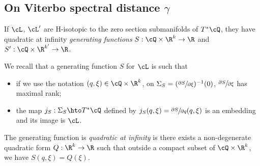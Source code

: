 \subsection{On Viterbo spectral distance \texorpdfstring{$\gamma$}{gamma}}

If $\cL$, $\cL'$ are H-isotopic to the zero section sub\-manifolds of $T^*\cQ$, they have quadratic at infinity \emph{generating functions} \hbox{$S:\cQ\times \R^k\to \R$} and $S':\cQ\times \R^{k'}\to \R$.

We recall that a generating function $S$ for $\cL$ is such that
\begin{itemize}
\item if we use the notation $(q, \xi)\in \cQ\times \R^k$, on $\Sigma_S=(\sfrac{\partial S}{\partial \xi})^{-1}(0)$, $\sfrac{\partial S}{\partial \xi}$ has maximal rank;
\item the map $j_S:\Sigma_S \hto T^*\cQ$ defined by $j_S(q, \xi)=\sfrac{\partial S}{\partial q}(q, \xi)$ is an embedding and its image is $\cL$.
\end{itemize}
The generating function is \emph{quadratic at infinity} is there exists a non-degenerate quadratic form $Q:\R^k\to \R$ such that outside a compact subset of $\cQ\times \R^k$, we have $S(q,\xi)=Q(\xi)$.

